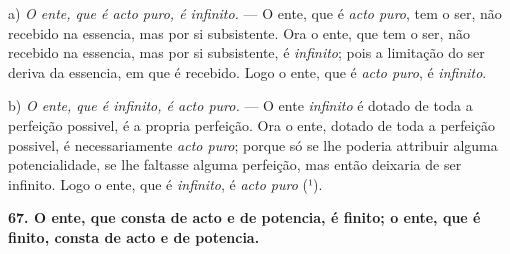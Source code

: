 a) \emph{O ente, que é acto puro, é infinito.} --- O ente, que é \emph{acto puro}, tem o ser, não recebido na essencia, mas por si subsistente. Ora o ente, que tem o ser, não recebido na essencia, mas por si subsistente, é \emph{infinito}; pois a limitação do ser deriva da essencia, em que é recebido. Logo o ente, que é \emph{acto puro}, é \emph{infinito}.

b) \emph{O ente, que é infinito, é acto puro.} --- O ente \emph{infinito} é dotado de toda a perfeição possivel, é a propria perfeição. Ora o ente, dotado de toda a perfeição possivel, é necessariamente \emph{acto puro}; porque só se lhe poderia attribuir alguma potencialidade, se lhe faltasse alguma perfeição, mas então deixaria de ser infinito. Logo o ente, que é \emph{infinito}, é \emph{acto puro} (¹).

\textbf{67. O ente, que consta de acto e de potencia, é finito; o ente, que é finito, consta de acto e de potencia.}

